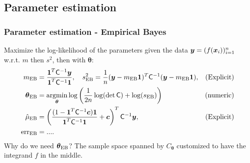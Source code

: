 \documentclass[handout, 10pt,compress,xcolor={usenames,dvipsnames}]{beamer} %
\newcommand{\bm}[1]{\boldsymbol{#1}}
\newcommand{\MLE}{\textup{EB}}
\newcommand{\mCInv}{\mC^{-1}}
\newcommand{\vthetaMLE}{{\vtheta}_{\MLE}}
\newcommand{\err}{{\text{err}}}
\renewcommand{\vtheta}{{\bm{\theta}}}
\newcommand{\pause}{}
\begin{document}
\subsection{Parameter estimation}



\begin{frame}
\frametitle{Parameter estimation - Empirical Bayes}
\vspace*{-6ex}
Maximize the log-likelihood of the parameters given the data $\boldsymbol{y} = (f(\boldsymbol{x}_i))_{i=1}^{n}$ w.r.t. $m$ then $s^2$, then with $\vtheta$: 
\begin{align*}
m_{\MLE} &= \frac{\bm{1}^T \mC^{-1} \vy}{\bm{1}^T \mC^{-1} \bm{1}}, \quad
s^2_{\MLE} =
\frac{1}{n} (\vy-m_{\MLE}\bm{1})^T \mC^{-1} (\vy-m_{\MLE}\bm{1})  , & \text{(Explicit)}
\\
\vthetaMLE &= \argmin_{\vtheta}
\log
\left(
\frac{1}{2n} \log(\det \mC) + \log(s_\MLE)
\right)
 & \text{(numeric)}
\\
\hmu_\MLE  &= 
\left(
\frac{ (1 - \vone^T  \mCInv\vc )  \vone }{ \vone^T \mCInv \vone}   +  \vc 
\right)^T  \mCInv \vy  , & \text{(Explicit)} 
\\
\err_{\MLE} &= ....
\end{align*}
\pause %
\alert{Why do we need $\vtheta_{\MLE}$?} \quad The sample space spanned by $C_{\vtheta}$ customized to have the integrand $f$ in the middle.
\end{frame}



\end{document}
